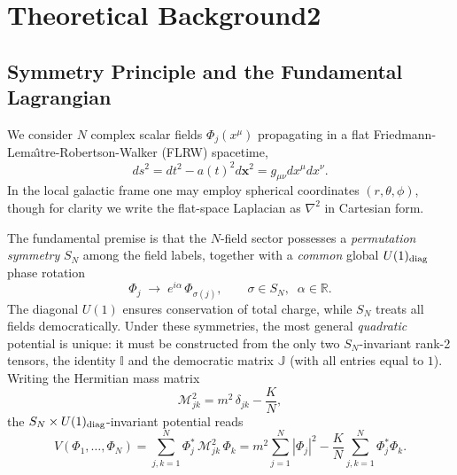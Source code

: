 


\section{Theoretical Background2}
\label{sec:theory}

\subsection{Symmetry Principle and the Fundamental Lagrangian}
\label{subsec:lagrangian}

We consider $N$ complex scalar fields $\Phi_j(x^\mu)$ propagating in a flat Friedmann-Lema\^{\i}tre-Robertson-Walker (FLRW) spacetime,
\begin{equation}
ds^2 = dt^2 - a(t)^2 d\mathbf{x}^2 = g_{\mu\nu}dx^\mu dx^\nu .
\end{equation}
In the local galactic frame one may employ spherical coordinates $(r,\theta,\phi)$, though for clarity we write the flat-space Laplacian as $\nabla^2$ in Cartesian form.

The fundamental premise is that the $N$-field sector possesses a \emph{permutation symmetry} $S_N$ among the field labels, together with a \emph{common} global $U(1)_{\rm diag}$ phase rotation
\begin{equation}
\Phi_j \;\longrightarrow\; e^{i\alpha}\,\Phi_{\sigma(j)}, \qquad \sigma\in S_N,\;\; \alpha\in\mathbb{R}.
\end{equation}
The diagonal $U(1)$ ensures conservation of total charge, while $S_N$ treats all fields democratically. Under these symmetries, the most general \emph{quadratic} potential is unique: it must be constructed from the only two $S_N$-invariant rank-2 tensors, the identity $\mathbb{I}$ and the democratic matrix $\mathbb{J}$ (with all entries equal to $1$). Writing the Hermitian mass matrix
\begin{equation}
\mathcal{M}^2_{jk} = m^2\,\delta_{jk} - \frac{K}{N},
\end{equation}
the $S_N\times U(1)_{\rm diag}$-invariant potential reads
\begin{equation}
V(\Phi_1,\dots,\Phi_N)
= \sum_{j,k=1}^N \Phi_j^*\,\mathcal{M}^2_{jk}\,\Phi_k
= m^2\sum_{j=1}^N |\Phi_j|^2 - \frac{K}{N}\sum_{j,k=1}^N \Phi_j^*\Phi_k .
\end{equation}

